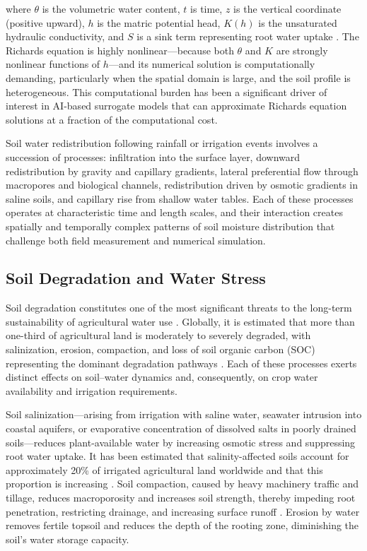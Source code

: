 \documentclass[land,review,accept,pdftex,oneauthor]{Definitions/mdpi}
\begin{document}
\noindent where $\theta$ is the volumetric water content, $t$ is time, $z$ is the vertical coordinate (positive upward), $h$ is the matric potential head, $K(h)$ is the unsaturated hydraulic conductivity, and $S$ is a sink term representing root water uptake \citep{Richards1931,Vereecken2008}. The Richards equation is highly nonlinear---because both $\theta$ and $K$ are strongly nonlinear functions of $h$---and its numerical solution is computationally demanding, particularly when the spatial domain is large, and the soil profile is heterogeneous. This computational burden has been a significant driver of interest in AI-based surrogate models that can approximate Richards equation solutions at a fraction of the computational cost.

Soil water redistribution following rainfall or irrigation events involves a succession of processes: infiltration into the surface layer, downward redistribution by gravity and capillary gradients, lateral preferential flow through macropores and biological channels, redistribution driven by osmotic gradients in saline soils, and capillary rise from shallow water tables. Each of these processes operates at characteristic time and length scales, and their interaction creates spatially and temporally complex patterns of soil moisture distribution that challenge both field measurement and numerical simulation.

\subsection{Soil Degradation and Water Stress}

Soil degradation constitutes one of the most significant threats to the long-term sustainability of agricultural water use \cite{Safriel2007}. Globally, it is estimated that more than one-third of agricultural land is moderately to severely degraded, with salinization, erosion, compaction, and loss of soil organic carbon (SOC) representing the dominant degradation pathways \citep{oldeman1992global}. Each of these processes exerts distinct effects on soil--water dynamics and, consequently, on crop water availability and irrigation requirements.

Soil salinization---arising from irrigation with saline water, seawater intrusion into coastal aquifers, or evaporative concentration of dissolved salts in poorly drained soils---reduces plant-available water by increasing osmotic stress and suppressing root water uptake. It has been estimated that salinity-affected soils account for approximately 20\% of irrigated agricultural land worldwide and that this proportion is increasing \citep{nachshon2018cropland}. Soil compaction, caused by heavy machinery traffic and tillage, reduces macroporosity and increases soil strength, thereby impeding root penetration, restricting drainage, and increasing surface runoff \citep{Lemenkova202222}. Erosion by water removes fertile topsoil and reduces the depth of the rooting zone, diminishing the soil's water storage capacity.
\end{document}

